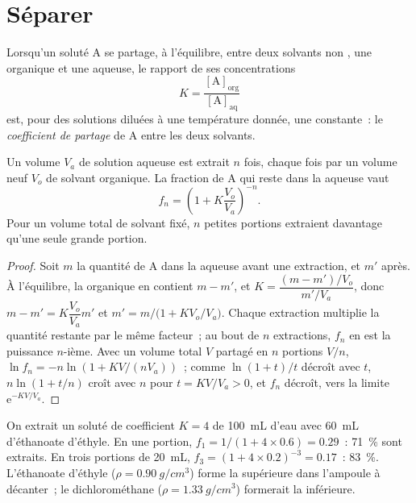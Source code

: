 \section{Séparer}

\begin{definition}\label{def:b1:lab-techniques-1:partition-coefficient}
Lorsqu'un soluté A se partage, à l'équilibre, entre deux solvants non
, une  organique et une  aqueuse, le rapport de ses
concentrations
\[
  K = \frac{[\mathrm{A}]_{\mathrm{org}}}{[\mathrm{A}]_{\mathrm{aq}}}
\]
est, pour des solutions diluées à une température donnée, une
constante~: le \emph{coefficient de partage}
de A entre les deux solvants.
\end{definition}

\begin{proposition}\label{prop:b1:lab-techniques-1:multiple-extractions}
Un volume $V_a$ de solution aqueuse est extrait $n$ fois, chaque fois par
un volume neuf $V_o$ de solvant organique. La fraction de A qui reste
dans la  aqueuse vaut
\[
  f_n = \left(1 + K \frac{V_o}{V_a}\right)^{-n}.
\]
Pour un volume total de solvant fixé, $n$ petites portions extraient
davantage qu'une seule grande portion.
\end{proposition}
\begin{proof}
Soit $m$ la quantité de A dans la  aqueuse avant une extraction, et
$m'$ après. À l'équilibre, la  organique en contient $m - m'$, et
$K = \dfrac{(m - m')/V_o}{m'/V_a}$, donc $m - m' = K\dfrac{V_o}{V_a} m'$ et
$m' = m\big/\bigl(1 + K V_o/V_a\bigr)$. Chaque extraction multiplie la
quantité restante par le même facteur~; au bout de $n$ extractions,
$f_n$ en est la puissance $n$-ième. Avec un volume total $V$ partagé en
$n$ portions $V/n$,
$\ln f_n = -n \ln(1 + KV/(nV_a))$~; comme $\ln(1+t)/t$ décroît avec $t$,
$n \ln(1 + t/n)$ croît avec $n$ pour $t = KV/V_a > 0$, et $f_n$
décroît, vers la limite $\mathrm{e}^{-KV/V_a}$.
\end{proof}

\begin{example}
On extrait un soluté de coefficient $K = 4$ de \qty{100}{mL} d'eau avec
\qty{60}{mL} d'éthanoate d'éthyle. En une portion,
$f_1 = 1/(1 + 4 \times 0.6) = 0.29$~: \qty{71}{\percent} sont extraits.
En trois portions de \qty{20}{mL}, $f_3 = (1 + 4 \times 0.2)^{-3} = 0.17$~:
\qty{83}{\percent}. L'éthanoate d'éthyle ($\rho = \qty{0.90}{g/cm^3}$)
forme la  supérieure dans l'ampoule à décanter~; le dichlorométhane
($\rho = \qty{1.33}{g/cm^3}$) formerait la  inférieure.
\end{example}

